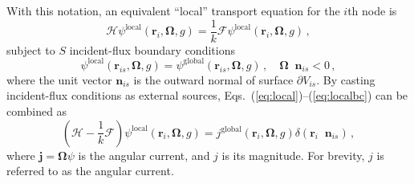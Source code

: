 \documentclass[5p,times,twocolumn,10pt]{elsarticle}
\newcommand{\oper}[1]{\mathcal{#1}}
\newcommand{\EQS}[2]{Eqs.~(\ref{#1})--(\ref{#2})}
\DeclareMathOperator*{\dotp}{{\scriptscriptstyle \stackrel{\bullet}{{}}}}
\begin{document}
    With this notation, an equivalent ``local'' transport equation for the 
    $i$th node is
    \begin{equation}
        \oper{H}\psi^{\mathrm{local}}(\mathbf{r}_i,\bm{\Omega},g) = 
        \frac{1}{k} \oper{F} \psi^{\mathrm{local}}(\mathbf{r}_i,\bm{\Omega},g) 
        \, ,
        \label{eq:local}
    \end{equation}
    subject to  $S$  incident-flux boundary conditions 
    \begin{equation}
        \psi^{\mathrm{local}}(\mathbf{r}_{is}, \bm{\Omega}, g) = 
        \psi^{\mathrm{global}}(\mathbf{r}_{is},\bm{\Omega}, g) \, ,
        \quad \bm{\Omega} \dotp \mathbf{n}_{is} < 0 \, ,
        \label{eq:localbc}
    \end{equation}  
    where the unit vector $\mathbf{n}_{is}$ is the outward normal of surface 
    $\partial V_{is}$. By casting incident-flux conditions as external 
    sources, \EQS{eq:local}{eq:localbc} can be combined as 
    \begin{equation}
        \left ( \oper{H} - \frac{1}{k} \oper{F} \right 
        )\psi^{\mathrm{local}}(\mathbf{r}_i,\bm{\Omega},g) = 
        j^{\mathrm{global}}(\mathbf{r}_i, \bm{\Omega},g) 
        \delta(\mathbf{r}_i \dotp \mathbf{n}_{is}) \, ,  
        \label{eq:localcombined}
    \end{equation}
    where $\mathbf{j} = \bm{\Omega} \psi$ is the angular current, and $j$ is 
its 
    magnitude.  For brevity, $j$ is referred to as the angular current. 
    
\end{document}
